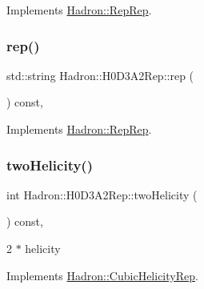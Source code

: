 Implements \mbox{\hyperlink{structHadron_1_1RepRep_ab3213025f6de249f7095892109575fde}{Hadron\+::\+Rep\+Rep}}.

\mbox{\label{structHadron_1_1H0D3A2Rep_a11e300b7b2215df67123d3d9e8747cb6}} 
\subsubsection{\texorpdfstring{rep()}{rep()}\hspace{0.1cm}{\footnotesize\ttfamily [5/5]}}
{\footnotesize\ttfamily std\+::string Hadron\+::\+H0\+D3\+A2\+Rep\+::rep (\begin{DoxyParamCaption}{ }\end{DoxyParamCaption}) const\hspace{0.3cm}{\ttfamily [inline]}, {\ttfamily [virtual]}}



Implements \mbox{\hyperlink{structHadron_1_1RepRep_ab3213025f6de249f7095892109575fde}{Hadron\+::\+Rep\+Rep}}.

\mbox{\label{structHadron_1_1H0D3A2Rep_a1e84c338f1fbedd7277f543926c976d6}} 
\subsubsection{\texorpdfstring{twoHelicity()}{twoHelicity()}\hspace{0.1cm}{\footnotesize\ttfamily [1/3]}}
{\footnotesize\ttfamily int Hadron\+::\+H0\+D3\+A2\+Rep\+::two\+Helicity (\begin{DoxyParamCaption}{ }\end{DoxyParamCaption}) const\hspace{0.3cm}{\ttfamily [inline]}, {\ttfamily [virtual]}}

2 $\ast$ helicity 

Implements \mbox{\hyperlink{structHadron_1_1CubicHelicityRep_af507aa56fc2747eacc8cb6c96db31ecc}{Hadron\+::\+Cubic\+Helicity\+Rep}}.

\mbox{\label{structHadron_1_1H0D3A2Rep_a1e84c338f1fbedd7277f543926c976d6}} 
